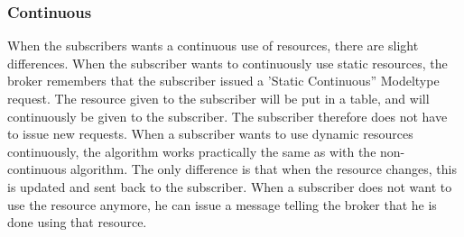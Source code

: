 		\subsubsection{Continuous}
		When the subscribers wants a continuous use of resources, there are slight differences. When the 
		subscriber wants to continuously use static resources, the broker remembers that the subscriber 
		issued a 'Static Continuous'' Modeltype request. The resource given to the subscriber will be put in a 
		table, and will continuously be given to the subscriber. The subscriber therefore does not have to 
		issue new requests. When a subscriber wants to use dynamic resources continuously, the algorithm 
		works practically the same as with the non-continuous algorithm. The only difference is that when 
		the resource changes, this is updated and sent back to the subscriber.
		When a subscriber does not want to use the resource anymore, he can issue a message telling the 
		broker that he is done using that resource.
